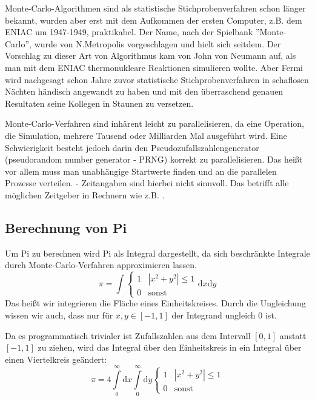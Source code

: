 \documentclass[german,bibnum,beleg,zihtitle,german,hyperref,utf8]{zihpub}
\begin{document}
Monte-Carlo-Algorithmen sind als statistische Stichprobenverfahren schon länger bekannt, wurden aber erst mit dem Aufkommen der ersten Computer, z.B. dem ENIAC um 1947-1949, praktikabel\cite{metropolis1987beginning}. Der Name, nach der Spielbank ''Monte-Carlo'', wurde von N.Metropolis vorgeschlagen und hielt sich seitdem. Der Vorschlag zu dieser Art von Algorithmus kam von John von Neumann auf, als man mit dem ENIAC thermonukleare Reaktionen simulieren wollte. Aber Fermi wird nachgesagt schon Jahre zuvor statistische Stichprobenverfahren in schaflosen Nächten händisch angewandt zu haben und mit den überraschend genauen Resultaten seine Kollegen in Staunen zu versetzen.

Monte-Carlo-Verfahren sind inhärent leicht zu parallelisieren, da eine Operation, die Simulation, mehrere Tausend oder Milliarden Mal ausgeführt wird. Eine Schwierigkeit besteht jedoch darin den Pseudozufallszahlengenerator (pseudorandom number generator - PRNG) korrekt zu parallelisieren. Das heißt vor allem muss man unabhängige Startwerte finden und an die parallelen Prozesse verteilen.
 - Zeitangaben sind hierbei nicht sinnvoll. Das betrifft alle möglichen Zeitgeber in Rechnern wie z.B. .

\subsection{Berechnung von Pi}

Um Pi zu berechnen wird Pi als Integral dargestellt, da sich beschränkte Integrale durch Monte-Carlo-Verfahren approximieren lassen.
\begin{equation}
	\pi = \int \begin{cases}
					1 & |x^2+y^2| \leq 1\\
					0 & \text{sonst} 
			   \end{cases} 
		  \mathrm{d}x \mathrm{d}y
\end{equation}
Das heißt wir integrieren die Fläche eines Einheitskreises. Durch die Ungleichung wissen wir auch, dass nur für $x,y\in [-1,1]$ der Integrand ungleich $0$ ist. 

Da es programmatisch trivialer ist Zufallszahlen aus dem Intervall $[0,1]$ anstatt $[-1,1]$ zu ziehen, wird das Integral über den Einheitskreis in ein Integral über einen Viertelkreis geändert:
\begin{equation}
	\label{eq:piint}
	\pi = 4 \int\limits_{0}^\infty \mathrm{d}x  
		    \int\limits_{0}^\infty \mathrm{d}y 
		    \begin{cases}1 & |x^2+y^2| \leq 1\\0 & \text{sonst} \end{cases}
\end{equation}
\end{document}
